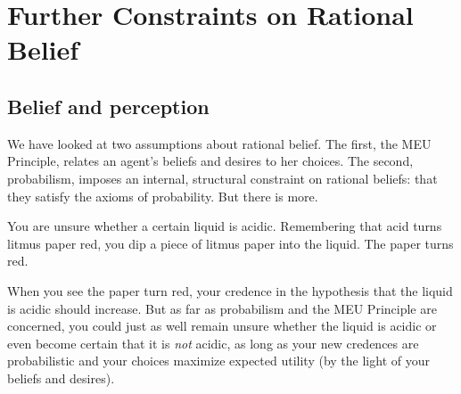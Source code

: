 \chapter{Further Constraints on Rational Belief}\label{ch:constraints}




\section{Belief and perception}

We have looked at two assumptions about rational belief. The first,
the MEU Principle, relates an agent's beliefs and desires to her
choices. The second, probabilism, imposes an internal, structural
constraint on rational beliefs: that they satisfy the axioms of
probability. But there is more.

\begin{example}\label{ex:litmus}
  You are unsure whether a certain liquid is acidic. Remembering that
  acid turns litmus paper red, you dip a piece of litmus paper into
  the liquid. The paper turns red.
\end{example}

When you see the paper turn red, your credence in the hypothesis that
the liquid is acidic should increase. But as far as probabilism and
the MEU Principle are concerned, you could just as well remain unsure
whether the liquid is acidic or even become certain that it is
\emph{not} acidic, as long as your new credences are probabilistic and
your choices maximize expected utility (by the light of your beliefs
and desires).

